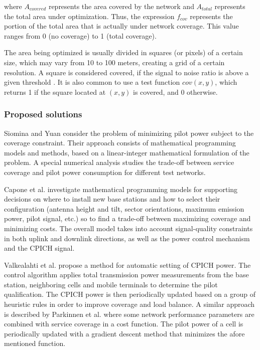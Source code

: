 where $A_{covered}$ represents the area covered by the network and
$A_{total}$ represents the total area under optimization. Thus, the
expression $f_{cov}$ represents the portion of the total area that
is actually under network coverage. This value ranges from 0 (no coverage)
to 1 (total coverage).

The area being optimized is usually divided in squares (or pixels)
of a certain size, which may vary from 10 to 100 meters, creating
a grid of a certain resolution. A square is considered covered, if
the signal to noise ratio is above a given threshold \cite{3GPP_TS_25.133}.
It is also common to use a test function $cov(x,y)$,
which returns 1 if the square located at $(x,y)$ is covered, and
0 otherwise.


\subsubsection{Proposed solutions}

Siomina and Yuan \cite{Siomina:Minimum.pilot.power.for.service.coverage}
consider the problem of minimizing pilot power subject to the coverage
constraint. Their approach consists of mathematical programming models
and methods, based on a linear-integer mathematical formulation of
the problem. A special numerical analysis studies the trade-off between
service coverage and pilot power consumption for different test networks.

Capone et al. \cite{Amaldi:Radio.planning.and.coveraga.optimization}
investigate mathematical programming models for supporting decisions
on where to install new base stations and how to select their configuration
(antenna height and tilt, sector orientations, maximum emission power,
pilot signal, etc.) so to find a trade-off between maximizing coverage
and minimizing costs. The overall model takes into account signal-quality
constraints in both uplink and downlink directions, as well as the
power control mechanism and the CPICH signal.

Valkealahti et al. \cite{Coverage.balance:2002} propose a method
for automatic setting of CPICH power. The control algorithm applies
total transmission power measurements from the base station, neighboring
cells and mobile terminals to determine the pilot qualification. The
CPICH power is then periodically updated based on a group of heuristic
rules in order to improve coverage and load balance. A similar approach
is described by Parkinnen et al. \cite{Coverage.optimization.with.cost.function:2002}
where some network performance parameters are combined with service
coverage in a cost function. The pilot power of a cell is periodically
updated with a gradient descent method that minimizes the afore mentioned
function.


